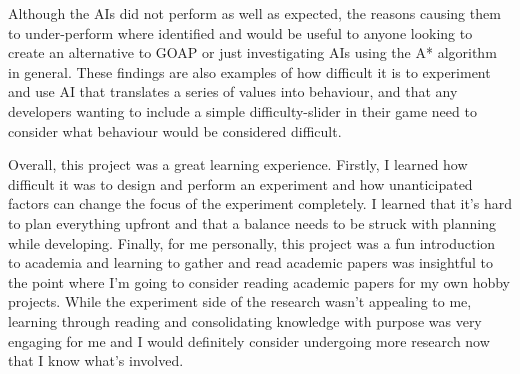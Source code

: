 \documentclass[11pt, a4paper]{report}
\begin{document}
Although the AIs did not perform as well as expected, the reasons causing them to under-perform where identified and would be useful to anyone looking to create an alternative to GOAP or just investigating AIs using the A* algorithm in general. These findings are also examples of how difficult it is to experiment and use AI that translates a series of values into behaviour, and that any developers wanting to include a simple difficulty-slider in their game need to consider what behaviour would be considered difficult. 

Overall, this project was a great learning experience. Firstly, I learned how difficult it was to design and perform an experiment and how unanticipated factors can change the focus of the experiment completely. I learned that it's hard to plan everything upfront and that a balance needs to be struck with planning while developing. Finally, for me personally, this project was a fun introduction to academia and learning to gather and read academic papers was insightful to the point where I'm going to consider reading academic papers for my own hobby projects. While the experiment side of the research wasn't appealing to me, learning through reading and consolidating knowledge with purpose was very engaging for me and I would definitely consider undergoing more research now that I know what's involved.

\cleardoublepage
\printbibliography[
  heading=bibintoc,
  title={References}
]
\end{document}
